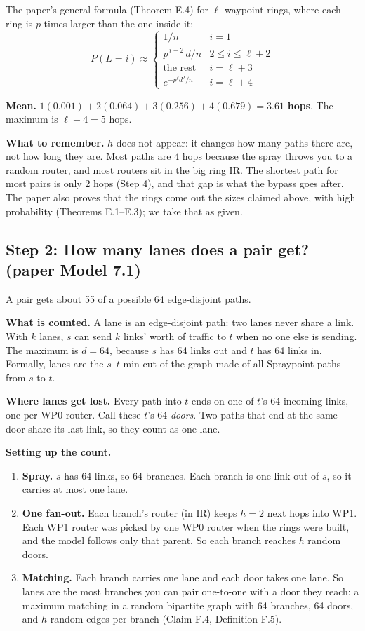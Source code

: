 The paper's general formula (Theorem E.4) for $\ell$ waypoint rings, where each ring is $p$ times larger than the one inside it:
\[
P(L = i) \approx
\begin{cases}
  1/n & i = 1 \\
  p^{\,i-2}\, d/n & 2 \le i \le \ell + 2 \\
  \text{the rest} & i = \ell + 3 \\
  e^{-p^{\ell} d^2 / n} & i = \ell + 4
\end{cases}
\]

\textbf{Mean.} $1(0.001) + 2(0.064) + 3(0.256) + 4(0.679) = \mathbf{3.61}$ \textbf{hops}. The maximum is $\ell + 4 = 5$ hops.

\textbf{What to remember.} $h$ does not appear: it changes how many paths there are, not how long they are. Most paths are 4 hops because the spray throws you to a random router, and most routers sit in the big ring IR. The shortest path for most pairs is only 2 hops (Step 4), and that gap is what the bypass goes after. The paper also proves that the rings come out the sizes claimed above, with high probability (Theorems E.1--E.3); we take that as given.

\subsection{Step 2: How many lanes does a pair get? (paper Model 7.1)}

A pair gets about 55 of a possible 64 edge-disjoint paths.

\textbf{What is counted.} A lane is an edge-disjoint path: two lanes never share a link. With $k$ lanes, $s$ can send $k$ links' worth of traffic to $t$ when no one else is sending. The maximum is $d = 64$, because $s$ has 64 links out and $t$ has 64 links in. Formally, lanes are the $s$--$t$ min cut of the graph made of all Spraypoint paths from $s$ to $t$.

\textbf{Where lanes get lost.} Every path into $t$ ends on one of $t$'s 64 incoming links, one per WP0 router. Call these $t$'s 64 \emph{doors}. Two paths that end at the same door share its last link, so they count as one lane.

\textbf{Setting up the count.}
\begin{enumerate}
  \item \textbf{Spray.} $s$ has 64 links, so 64 branches. Each branch is one link out of $s$, so it carries at most one lane.
  \item \textbf{One fan-out.} Each branch's router (in IR) keeps $h = 2$ next hops into WP1. Each WP1 router was picked by one WP0 router when the rings were built, and the model follows only that parent. So each branch reaches $h$ random doors.
  \item \textbf{Matching.} Each branch carries one lane and each door takes one lane. So lanes are the most branches you can pair one-to-one with a door they reach: a maximum matching in a random bipartite graph with 64 branches, 64 doors, and $h$ random edges per branch (Claim F.4, Definition F.5).
\end{enumerate}

